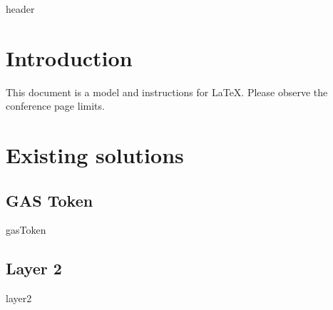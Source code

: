 \documentclass[conference]{IEEEtran}
\begin{document}
{header}

\section{Introduction}
This document is a model and instructions for \LaTeX.
Please observe the conference page limits. 


\section{Existing solutions}
\subsection{GAS Token}
{gasToken}
\subsection{Layer 2}
{layer2}




\end{document}

